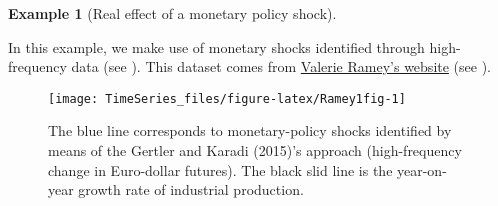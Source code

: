 \documentclass[
  12pt,
]{book}
\newenvironment{Shaded}{\begin{snugshade}}{\end{snugshade}}
\newcommand{\CommentTok}[1]{\textcolor[rgb]{0.56,0.35,0.01}{\textit{#1}}}
\newcommand{\ConstantTok}[1]{\textcolor[rgb]{0.00,0.00,0.00}{#1}}
\newcommand{\ControlFlowTok}[1]{\textcolor[rgb]{0.13,0.29,0.53}{\textbf{#1}}}
\newcommand{\DecValTok}[1]{\textcolor[rgb]{0.00,0.00,0.81}{#1}}
\newcommand{\FunctionTok}[1]{\textcolor[rgb]{0.00,0.00,0.00}{#1}}
\newcommand{\NormalTok}[1]{#1}
\newcommand{\OtherTok}[1]{\textcolor[rgb]{0.56,0.35,0.01}{#1}}
\newcommand{\SpecialCharTok}[1]{\textcolor[rgb]{0.00,0.00,0.00}{#1}}
\theoremstyle{definition}
\theoremstyle{definition}
\newtheorem{example}{Example}[chapter]
\theoremstyle{definition}
\theoremstyle{definition}
\theoremstyle{remark}
\begin{document}
\begin{example}[Real effect of a monetary policy shock]
\protect\hypertarget{exm:Ramey1}{}\label{exm:Ramey1}

In this example, we make use of monetary shocks identified through high-frequency data (see \citet{Gertler_Karadi_2015}). This dataset comes from \href{https://econweb.ucsd.edu/~vramey/research.html}{Valerie Ramey's website} (see \citet{Ramey_2016_NBER}).

\begin{Shaded}
\end{Shaded}

\begin{figure}
\texttt{[image: TimeSeries\_files/figure-latex/Ramey1fig-1]} \caption{The blue line corresponds to monetary-policy shocks identified by means of the Gertler and Karadi (2015)'s approach (high-frequency change in Euro-dollar futures). The black slid line is the year-on-year growth rate of industrial production.}\label{fig:Ramey1fig}
\end{figure}


\end{example}
\end{document}

